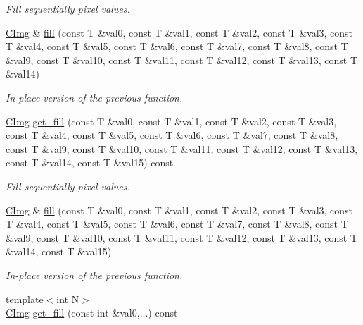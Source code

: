 \begin{DoxyCompactItemize}
\begin{DoxyCompactList}\small\item\em Fill sequentially pixel values. \end{DoxyCompactList}\item 
\hypertarget{structcimg__library_1_1_c_img_a2bedc7179ee82c1ac0a3fed3b728aabf}{\hyperlink{structcimg__library_1_1_c_img}{C\-Img} \& \hyperlink{structcimg__library_1_1_c_img_a2bedc7179ee82c1ac0a3fed3b728aabf}{fill} (const T \&val0, const T \&val1, const T \&val2, const T \&val3, const T \&val4, const T \&val5, const T \&val6, const T \&val7, const T \&val8, const T \&val9, const T \&val10, const T \&val11, const T \&val12, const T \&val13, const T \&val14)}\label{structcimg__library_1_1_c_img_a2bedc7179ee82c1ac0a3fed3b728aabf}

\begin{DoxyCompactList}\small\item\em In-\/place version of the previous function. \end{DoxyCompactList}\item 
\hypertarget{structcimg__library_1_1_c_img_a2aa569bb0fbff6d2d49fe70bd3abfda6}{\hyperlink{structcimg__library_1_1_c_img}{C\-Img} \hyperlink{structcimg__library_1_1_c_img_a2aa569bb0fbff6d2d49fe70bd3abfda6}{get\-\_\-fill} (const T \&val0, const T \&val1, const T \&val2, const T \&val3, const T \&val4, const T \&val5, const T \&val6, const T \&val7, const T \&val8, const T \&val9, const T \&val10, const T \&val11, const T \&val12, const T \&val13, const T \&val14, const T \&val15) const }\label{structcimg__library_1_1_c_img_a2aa569bb0fbff6d2d49fe70bd3abfda6}

\begin{DoxyCompactList}\small\item\em Fill sequentially pixel values. \end{DoxyCompactList}\item 
\hypertarget{structcimg__library_1_1_c_img_a9b0a6c3b5a07ada1d9f278ddf40239ef}{\hyperlink{structcimg__library_1_1_c_img}{C\-Img} \& \hyperlink{structcimg__library_1_1_c_img_a9b0a6c3b5a07ada1d9f278ddf40239ef}{fill} (const T \&val0, const T \&val1, const T \&val2, const T \&val3, const T \&val4, const T \&val5, const T \&val6, const T \&val7, const T \&val8, const T \&val9, const T \&val10, const T \&val11, const T \&val12, const T \&val13, const T \&val14, const T \&val15)}\label{structcimg__library_1_1_c_img_a9b0a6c3b5a07ada1d9f278ddf40239ef}

\begin{DoxyCompactList}\small\item\em In-\/place version of the previous function. \end{DoxyCompactList}\item 
\hypertarget{structcimg__library_1_1_c_img_a6f09022c84b7693f3552ffa00182474e}{{\footnotesize template$<$int N$>$ }\\\hyperlink{structcimg__library_1_1_c_img}{C\-Img} \hyperlink{structcimg__library_1_1_c_img_a6f09022c84b7693f3552ffa00182474e}{get\-\_\-fill} (const int \&val0,...) const }\label{structcimg__library_1_1_c_img_a6f09022c84b7693f3552ffa00182474e}


\end{DoxyCompactItemize}
